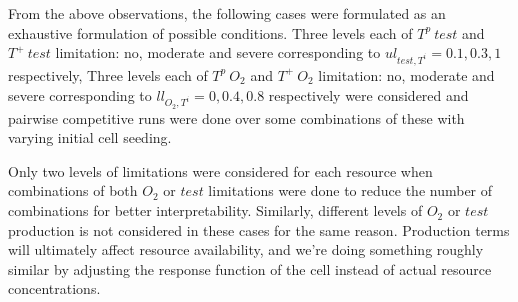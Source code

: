 \newpage

From the above observations, the following cases were formulated as an exhaustive formulation of possible conditions. Three levels each of $T^p\ test$ and $T^+\ test$ limitation: no, moderate and severe corresponding to $ul_{test,T^i}=0.1, 0.3, 1$ respectively, Three levels each of $T^p\ O_2$ and $T^+\ O_2$ limitation: no, moderate and severe corresponding to $ll_{O_2,T^i}=0, 0.4, 0.8$  respectively were considered and pairwise competitive runs were done over some combinations of these with varying initial cell seeding.

Only two levels of limitations were considered for each resource when combinations of both $O_2$ or $test$ limitations were done to reduce the number of combinations for better interpretability. Similarly, different levels of $O_2$ or $test$ production is not considered in these cases for the same reason. Production terms will ultimately affect resource availability, and we're doing something roughly similar by adjusting the response function of the cell instead of actual resource concentrations.

